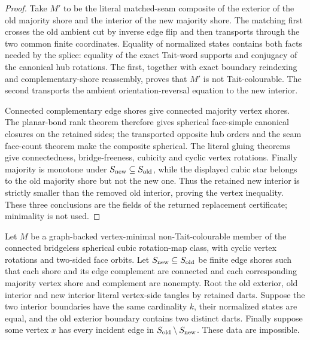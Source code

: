 \begin{proof}
Take \(M'\) to be the literal matched-seam composite of the exterior of the
old majority shore and the interior of the new majority shore.  The matching
first crosses the old ambient cut by inverse edge flip and then transports
through the two common finite coordinates.  Equality of normalized states
contains both facts needed by the splice: equality of the exact Tait-word
supports and conjugacy of the canonical hub rotations.  The first, together
with exact boundary reindexing and complementary-shore reassembly, proves
that \(M'\) is not Tait-colourable.  The second transports the ambient
orientation-reversal equation to the new interior.

Connected complementary edge shores give connected majority vertex shores.
The planar-bond rank theorem therefore gives spherical face-simple canonical
closures on the retained sides; the transported opposite hub orders and the
seam face-count theorem make the composite spherical.  The literal gluing
theorems give connectedness, bridge-freeness, cubicity and cyclic vertex
rotations.  Finally majority is monotone under
\(S_{\rm new}\subseteq S_{\rm old}\), while the displayed cubic star belongs
to the old majority shore but not the new one.  Thus the retained new
interior is strictly smaller than the removed old interior, proving the
vertex inequality.  These three conclusions are the fields of the returned
replacement certificate; minimality is not used.
\end{proof}

\begin{theorem}
\label{thm:majority-shore-physical-replacement}
Let \(M\) be a graph-backed vertex-minimal non-Tait-colourable member of the
connected bridgeless spherical cubic rotation-map class, with cyclic vertex
rotations and two-sided face orbits.  Let
\(S_{\rm new}\subseteq S_{\rm old}\)
be finite edge shores such that each shore and its edge complement are
connected and each corresponding majority vertex shore and complement are
nonempty.  Root the old exterior, old interior and new interior literal
vertex-side tangles by retained darts.  Suppose the two interior boundaries
have the same cardinality \(k\), their normalized states are equal, and the
old exterior boundary contains two distinct darts.  Finally suppose some
vertex \(x\) has every incident edge in
\(S_{\rm old}\setminus S_{\rm new}\).  These data are impossible.
\end{theorem}

